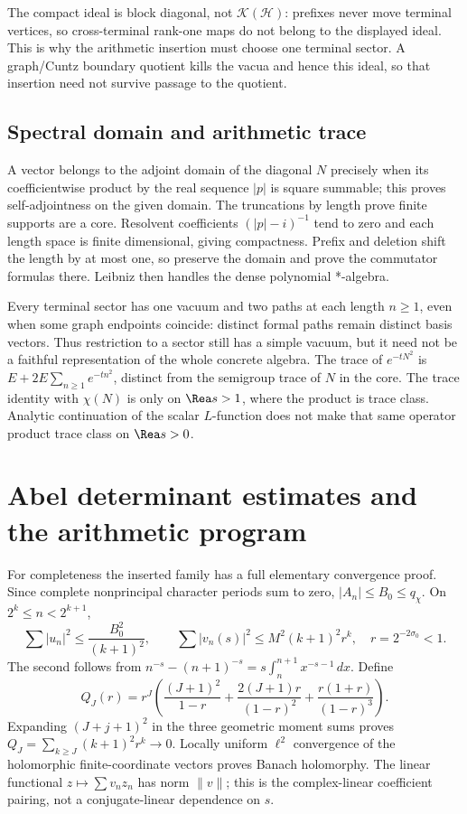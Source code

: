 \documentclass[11pt,oneside,openany]{book}
\theoremstyle{definition}\newtheorem{definition}[theorem]{Definition}
\theoremstyle{remark}\newtheorem{remark}[theorem]{Remark}
\begin{document}
The compact ideal is block diagonal, not $\mathcal K(\mathcal H)$: prefixes never move terminal vertices, so cross-terminal rank-one maps do not belong to the displayed ideal. This is why the arithmetic insertion must choose one terminal sector. A graph/Cuntz boundary quotient kills the vacua and hence this ideal, so that insertion need not survive passage to the quotient.

\section{Spectral domain and arithmetic trace}
A vector belongs to the adjoint domain of the diagonal $N$ precisely when its coefficientwise product by the real sequence $|p|$ is square summable; this proves self-adjointness on the given domain. The truncations by length prove finite supports are a core. Resolvent coefficients $(|p|-i)^{-1}$ tend to zero and each length space is finite dimensional, giving compactness. Prefix and deletion shift the length by at most one, so preserve the domain and prove the commutator formulas there. Leibniz then handles the dense polynomial *-algebra.

Every terminal sector has one vacuum and two paths at each length $n\ge1$, even when some graph endpoints coincide: distinct formal paths remain distinct basis vectors. Thus restriction to a sector still has a simple vacuum, but it need not be a faithful representation of the whole concrete algebra. The trace of $e^{-tN^2}$ is $E+2E\sum_{n\ge1}e^{-tn^2}$, distinct from the semigroup trace of $N$ in the core. The trace identity with $\chi(N)$ is only on $\Rea s>1$, where the product is trace class. Analytic continuation of the scalar $L$-function does not make that same operator product trace class on $\Rea s>0$.


\chapter{Abel determinant estimates and the arithmetic program}
For completeness the inserted family has a full elementary convergence proof. Since complete nonprincipal character periods sum to zero, $|A_n|\le B_0\le q_\chi$. On $2^k\le n<2^{k+1}$,
\[
 \sum |u_n|^2\le\frac{B_0^2}{(k+1)^2},\qquad
 \sum |v_n(s)|^2\le M^2(k+1)^2r^k,\quad r=2^{-2\sigma_0}<1.
\]
The second follows from $n^{-s}-(n+1)^{-s}=s\int_n^{n+1}x^{-s-1}\,dx$. Define
\[
 Q_J(r)=r^J\left(\frac{(J+1)^2}{1-r}
 +\frac{2(J+1)r}{(1-r)^2}+\frac{r(1+r)}{(1-r)^3}\right).
\]
Expanding $(J+j+1)^2$ in the three geometric moment sums proves $Q_J=\sum_{k\ge J}(k+1)^2r^k\to0$. Locally uniform $\ell^2$ convergence of the holomorphic finite-coordinate vectors proves Banach holomorphy. The linear functional $z\mapsto\sum v_nz_n$ has norm $\|v\|$; this is the complex-linear coefficient pairing, not a conjugate-linear dependence on $s$.
\end{document}

